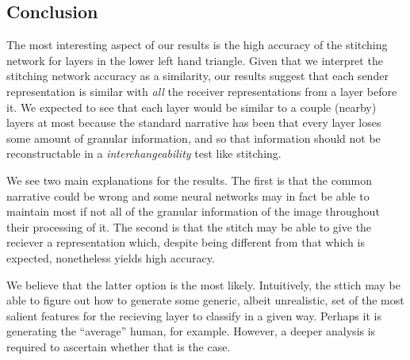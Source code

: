 \documentclass{article} %
\begin{document}
\subsection*{Conclusion}
The most interesting aspect of our results is the high accuracy of the stitching network
for layers in the lower left hand triangle. Given that we interpret the stitching network accuracy
as a similarity, our results suggest that each sender representation is similar with \textit{all}
the receiver representations from a layer before it. We expected to see that each layer would be
similar to a couple (nearby) layers at most because the standard narrative has been that 
every layer loses some amount of granular information, and so that information should not be reconstructable
in a \textit{interchangeability} test like stitching.

We see two main explanations for the results. The first is that the common narrative could be wrong and some neural
networks may in fact be able to maintain most if not all of the granular information of the image throughout their
processing of it. The second is that the stitch may be able to give the reciever a representation which, despite being
different from that which is expected, nonetheless yields high accuracy.

We believe that the latter option is the most likely. Intuitively, the sttich may be able to figure out how to
generate some generic, albeit unrealistic, set of the most salient features for the recieving layer to classify
in a given way. Perhaps it is generating the ``average'' human, for example. However, a deeper analysis is required
to ascertain whether that is the case.

\newpage


\end{document}
